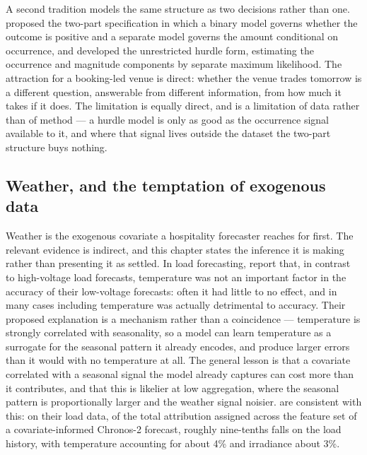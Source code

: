 A second tradition models the same structure as two decisions rather than one.
\citet{cragg_statistical_1971} proposed the two-part specification in which a
binary model governs whether the outcome is positive and a separate model
governs the amount conditional on occurrence, and \citet{mullahy_specification_1986}
developed the unrestricted hurdle form, estimating the occurrence and magnitude
components by separate maximum likelihood. The attraction for a booking-led
venue is direct: whether the venue trades tomorrow is a different question,
answerable from different information, from how much it takes if it does. The
limitation is equally direct, and is a limitation of data rather than of
method --- a hurdle model is only as good as the occurrence signal available to
it, and where that signal lives outside the dataset the two-part structure
buys nothing.

\subsection*{Weather, and the temptation of exogenous data}

Weather is the exogenous covariate a hospitality forecaster reaches for first.
The relevant evidence is indirect, and this chapter states the inference it is
making rather than presenting it as settled. In load forecasting,
\citet{haben_short_2019} report that, in contrast to high-voltage load
forecasts, temperature was not an important factor in the accuracy of their
low-voltage forecasts: often it had little to no effect, and in many cases
including temperature was actually detrimental to accuracy. Their proposed
explanation is a mechanism rather than a coincidence --- temperature is
strongly correlated with seasonality, so a model can learn temperature as a
surrogate for the seasonal pattern it already encodes, and produce larger
errors than it would with no temperature at all. The general lesson is that a
covariate correlated with a seasonal signal the model already captures can cost
more than it contributes, and that this is likelier at low aggregation, where
the seasonal pattern is proportionally larger and the weather signal noisier.
\citet{hertel_explainable_2026} are consistent with this: on their load data,
of the total attribution assigned across the feature set of a
covariate-informed Chronos-2 forecast, roughly nine-tenths falls on the load
history, with temperature accounting for about 4\% and irradiance about 3\%.

